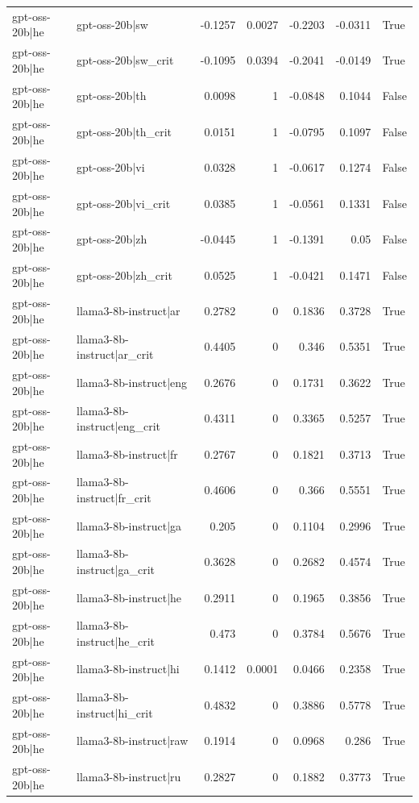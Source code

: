 \begin{table}
\begin{tabular}{l l r r r r l}
gpt-oss-20b|he & gpt-oss-20b|sw & -0.1257 & 0.0027 & -0.2203 & -0.0311 & True \\
gpt-oss-20b|he & gpt-oss-20b|sw_crit & -0.1095 & 0.0394 & -0.2041 & -0.0149 & True \\
gpt-oss-20b|he & gpt-oss-20b|th & 0.0098 & 1 & -0.0848 & 0.1044 & False \\
gpt-oss-20b|he & gpt-oss-20b|th_crit & 0.0151 & 1 & -0.0795 & 0.1097 & False \\
gpt-oss-20b|he & gpt-oss-20b|vi & 0.0328 & 1 & -0.0617 & 0.1274 & False \\
gpt-oss-20b|he & gpt-oss-20b|vi_crit & 0.0385 & 1 & -0.0561 & 0.1331 & False \\
gpt-oss-20b|he & gpt-oss-20b|zh & -0.0445 & 1 & -0.1391 & 0.05 & False \\
gpt-oss-20b|he & gpt-oss-20b|zh_crit & 0.0525 & 1 & -0.0421 & 0.1471 & False \\
gpt-oss-20b|he & llama3-8b-instruct|ar & 0.2782 & 0 & 0.1836 & 0.3728 & True \\
gpt-oss-20b|he & llama3-8b-instruct|ar_crit & 0.4405 & 0 & 0.346 & 0.5351 & True \\
gpt-oss-20b|he & llama3-8b-instruct|eng & 0.2676 & 0 & 0.1731 & 0.3622 & True \\
gpt-oss-20b|he & llama3-8b-instruct|eng_crit & 0.4311 & 0 & 0.3365 & 0.5257 & True \\
gpt-oss-20b|he & llama3-8b-instruct|fr & 0.2767 & 0 & 0.1821 & 0.3713 & True \\
gpt-oss-20b|he & llama3-8b-instruct|fr_crit & 0.4606 & 0 & 0.366 & 0.5551 & True \\
gpt-oss-20b|he & llama3-8b-instruct|ga & 0.205 & 0 & 0.1104 & 0.2996 & True \\
gpt-oss-20b|he & llama3-8b-instruct|ga_crit & 0.3628 & 0 & 0.2682 & 0.4574 & True \\
gpt-oss-20b|he & llama3-8b-instruct|he & 0.2911 & 0 & 0.1965 & 0.3856 & True \\
gpt-oss-20b|he & llama3-8b-instruct|he_crit & 0.473 & 0 & 0.3784 & 0.5676 & True \\
gpt-oss-20b|he & llama3-8b-instruct|hi & 0.1412 & 0.0001 & 0.0466 & 0.2358 & True \\
gpt-oss-20b|he & llama3-8b-instruct|hi_crit & 0.4832 & 0 & 0.3886 & 0.5778 & True \\
gpt-oss-20b|he & llama3-8b-instruct|raw & 0.1914 & 0 & 0.0968 & 0.286 & True \\
gpt-oss-20b|he & llama3-8b-instruct|ru & 0.2827 & 0 & 0.1882 & 0.3773 & True \\

\end{tabular}
\end{table}

